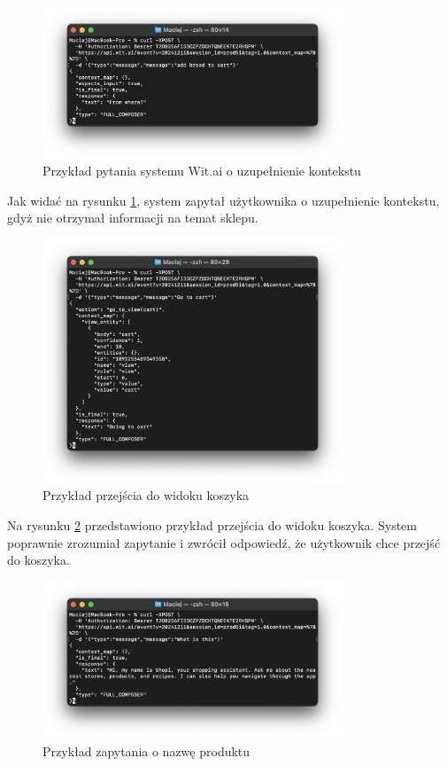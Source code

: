 \begin{figure}[H]
    \centering
    \includegraphics[width=0.8\textwidth]{images/witai_context_example.png}
    \caption{Przykład pytania systemu Wit.ai o uzupełnienie kontekstu}
    \label{fig:witai_context_example}
\end{figure}

Jak widać na rysunku \ref{fig:witai_context_example}, system zapytał użytkownika o uzupełnienie kontekstu, gdyż nie otrzymał informacji na temat sklepu.

\begin{figure}[H]
    \centering
    \includegraphics[width=0.8\textwidth]{images/witai_go_to_cart.png}
    \caption{Przykład przejścia do widoku koszyka}
    \label{fig:witai_cart_example}
\end{figure}

Na rysunku \ref{fig:witai_cart_example} przedstawiono przykład przejścia do widoku koszyka. System poprawnie zrozumiał zapytanie i zwrócił odpowiedź, że użytkownik chce przejść do koszyka.

\begin{figure}
    \centering
    \includegraphics[width=0.8\textwidth]{images/witai_what_is_this.png}
    \caption{Przykład zapytania o nazwę produktu}
    \label{fig:witai_what_is_this}
\end{figure}

